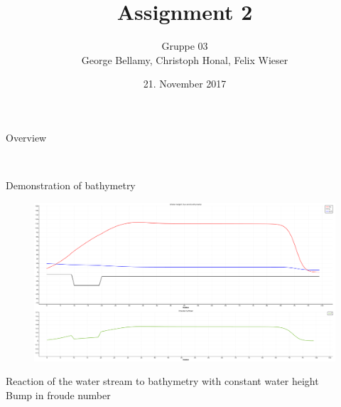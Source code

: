 \documentclass[shortpres]{beamer}
\title[{Tsunami simulation}]{Assignment 2}
\author[Bellamy, Honal, Wieser]{Gruppe 03\\George Bellamy, Christoph Honal, Felix Wieser\\\vspace{10pt}{\small Bachelorpraktikum}}
\institute[TU M\"unchen]{Technical University of Munich}
\date{21. November 2017}
\newcommand{\imgfullscale}{0.75}
\begin{document}
\maketitle


\begin{frame}{Overview}
	\begin{figure}
		\hspace{40pt}
		\hspace{0pt}\vspace{20pt}\\
	\end{figure}
\end{frame}

\begin{frame}{Demonstration of bathymetry}
	\begin{figure}
		\includegraphics[clip, width=\imgfullscale\linewidth]{img/Bathymetry_simple.png}
	\end{figure}
	Reaction of the water stream to bathymetry with constant water height\\
	Bump in froude number
\end{frame}
\end{document}
